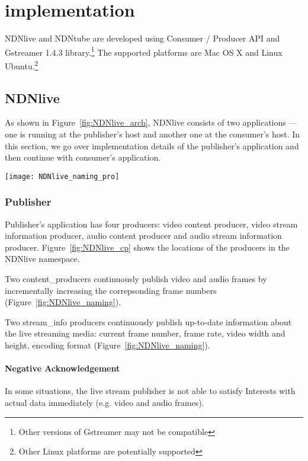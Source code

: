 \section{implementation} %
\label{sec:implementation}
NDNlive and NDNtube are developed using Consumer / Producer API and Gstreamer 1.4.3 library.\footnote{Other versions of Gstreamer may not be compatible}
The supported platforms are Mac OS X and Linux Ubuntu.\footnote{Other Linux platforms are potentially supported} 

\subsection{NDNlive}
As shown in Figure~\ref{fig:NDNlive_arch}, NDNlive consists of two applications --- one is running at the publisher's host and another one at the consumer's host. In this section, we go over implementation details of the publisher's application and then continue with consumer's application.

\begin{figure*}%
  \centering
  \texttt{[image: NDNlive\_naming\_pro]}
  \caption{Locations of producers and consumers in the NDNlive namespace.}
  \label{fig:NDNlive_cp}
\end{figure*}

\subsubsection{Publisher}
\label{ssub:NDNlive_pro}
Publisher's application has four producers: video content producer, video stream information producer, audio content producer and audio stream information producer. Figure~\ref{fig:NDNlive_cp} shows the locations of the producers in the NDNlive namespace. 

Two content\_producers continuously publish video and audio frames by incrementally increasing the correpsonding frame numbers (Figure~\ref{fig:NDNlive_naming}). 

Two stream\_info producers continuously publish up-to-date information about the live streaming media: current frame number, frame rate, video width and height, encoding format (Figure~\ref{fig:NDNlive_naming}).

\paragraph{Negative Acknowledgement} %
\label{par:negative_acknowledgement}
\vspace{0.3cm}
In some situations, the live stream publisher is not able to satisfy Interests with actual data immediately (e.g. video and audio frames).

